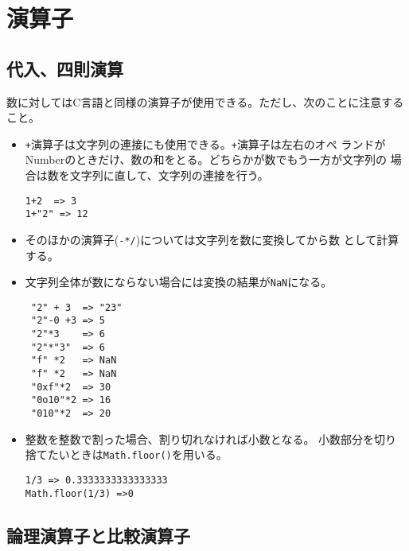 \section{演算子}\label{operator}
\subsection{代入、四則演算}
数に対してはC言語と同様の演算子が使用できる。ただし、次のことに注意する
こと。
\begin{itemize}
 \item \Verb-+-演算子は文字列の連接にも使用できる。\Verb-+-演算子は左右のオペ
ランドがNumberのときだけ、数の和をとる。どちらかが数でもう一方が文字列の
場合は数を文字列に直して、文字列の連接を行う。
\begin{Verbatim}
1+2  => 3
1+"2" => 12
\end{Verbatim}
 \item そのほかの演算子(\Verb+-*/+)については文字列を数に変換してから数
       として計算する。
 \item 文字列全体が数にならない場合には変換の結果が\Verb+NaN+になる。
\begin{Verbatim}
 "2" + 3  => "23"
 "2"-0 +3 => 5
 "2"*3    => 6
 "2"*"3"  => 6
 "f" *2   => NaN
 "f" *2   => NaN
 "0xf"*2  => 30
 "0o10"*2 => 16
 "010"*2  => 20
\end{Verbatim}
 \item 整数を整数で割った場合、割り切れなければ小数となる。
       小数部分を切り捨てたいときは\Verb+Math.floor()+を用いる。
\begin{Verbatim}
1/3 => 0.3333333333333333
Math.floor(1/3) =>0
\end{Verbatim}
\end{itemize}
\subsection{論理演算子と比較演算子}
